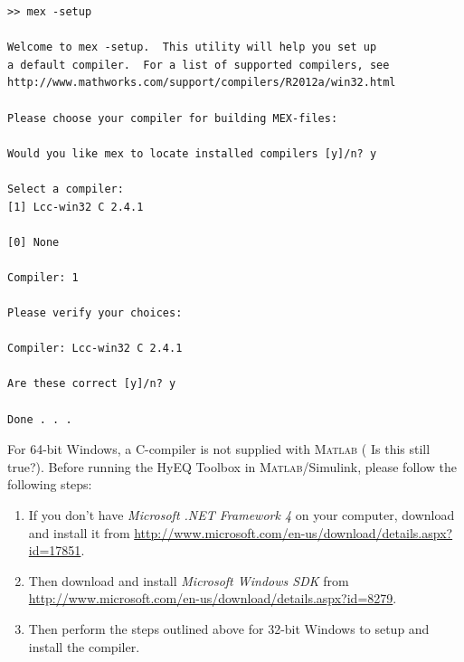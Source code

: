 \documentclass{article}
\newcommand{\matlab}{\textsc{Matlab}}
\begin{document}
\begin{verbatim}
>> mex -setup

Welcome to mex -setup.  This utility will help you set up
a default compiler.  For a list of supported compilers, see
http://www.mathworks.com/support/compilers/R2012a/win32.html

Please choose your compiler for building MEX-files:

Would you like mex to locate installed compilers [y]/n? y

Select a compiler:
[1] Lcc-win32 C 2.4.1

[0] None

Compiler: 1

Please verify your choices:

Compiler: Lcc-win32 C 2.4.1

Are these correct [y]/n? y

Done . . .
\end{verbatim}

For 64-bit Windows, a C-compiler is not supplied with \matlab{} ({\color{red} Is this still true?}). 
Before running the HyEQ Toolbox in \matlab{}/Simulink, please follow the following steps:

\begin{enumerate}
\item If you don't have {\em Microsoft .NET Framework 4} on your computer, 
download and install it from
\url{http://www.microsoft.com/en-us/download/details.aspx?id=17851}.
\item Then download and install {\em Microsoft Windows SDK} from
\url{http://www.microsoft.com/en-us/download/details.aspx?id=8279}.
\item Then perform the steps outlined above for 32-bit Windows to 
setup and install the compiler.
\end{enumerate}
\end{document}

